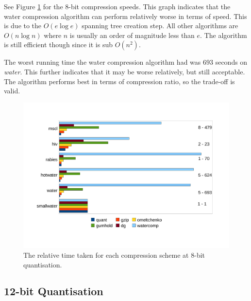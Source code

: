 \documentclass[a4paper]{report}
\begin{document}
See Figure \ref{fig:speed8} for the $8$-bit compression speeds. This graph
indicates that the water compression algorithm can perform relatively worse in
terms of speed. This is due to the $O(e \log e)$ spanning tree creation
step. All other algorithms are $O(n \log n)$ where $n$ is usually an order of
magnitude less than $e$. The algorithm is still efficient though since it is
sub $O(n^2)$.

The worst running time the water compression algorithm had was $693$ seconds
on \emph{water}. This further indicates that it may be worse relatively, but
still acceptable. The algorithm performs best in terms of compression ratio,
so the trade-off is valid.

\begin{figure}[h]
\centering
\includegraphics{images/speed8}
\caption{The relative time taken for each compression scheme at $8$-bit quantisation.}
\label{fig:speed8}
\end{figure}


\subsection{12-bit Quantisation}
\end{document}
